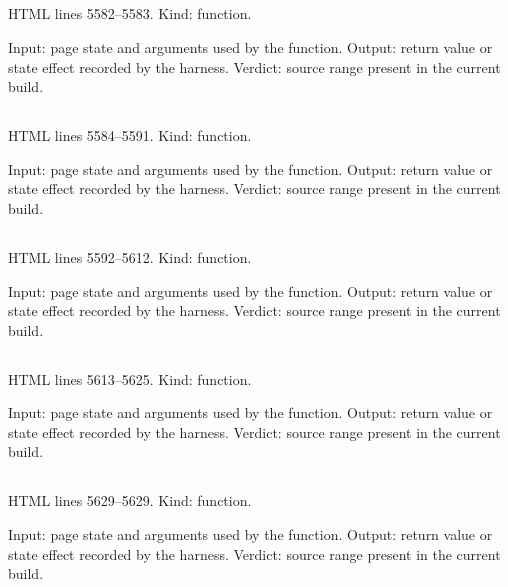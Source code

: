 \subsection*{\texttt{}}
\label{vf_247_graphSvgText}
HTML lines 5582--5583. Kind: function.

Input: page state and arguments used by the function.
Output: return value or state effect recorded by the harness.
Verdict: source range present in the current build.

\subsection*{\texttt{}}
\label{vf_248_graphPng}
HTML lines 5584--5591. Kind: function.

Input: page state and arguments used by the function.
Output: return value or state effect recorded by the harness.
Verdict: source range present in the current build.

\subsection*{\texttt{}}
\label{vf_249_graphAllZip}
HTML lines 5592--5612. Kind: function.

Input: page state and arguments used by the function.
Output: return value or state effect recorded by the harness.
Verdict: source range present in the current build.

\subsection*{\texttt{}}
\label{vf_250_wireGraphs}
HTML lines 5613--5625. Kind: function.

Input: page state and arguments used by the function.
Output: return value or state effect recorded by the harness.
Verdict: source range present in the current build.

\subsection*{\texttt{}}
\label{vf_251_markDirty}
HTML lines 5629--5629. Kind: function.

Input: page state and arguments used by the function.
Output: return value or state effect recorded by the harness.
Verdict: source range present in the current build.

